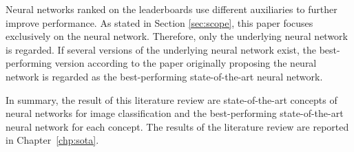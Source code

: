 Neural networks ranked on the leaderboards use different auxiliaries to further improve performance. \autocites{Lim.2019}{Harris.2020}{Huang.2019b}{Wang.2019}{Xie.2019b}{Touvron.2019}{Darlow.2018}{Tan.2019}
As stated in Section \ref{sec:scope}, this paper focuses exclusively on the neural network. Therefore, only the underlying neural network is regarded. If several versions of the underlying neural network exist, the best-performing version according to the paper originally proposing the neural network is regarded as the best-performing state-of-the-art neural network.
\par
In summary, the result of this literature review are state-of-the-art concepts of neural networks for image classification and the best-performing state-of-the-art neural network for each concept. The results of the literature review are reported in Chapter~\ref{chp:sota}.
